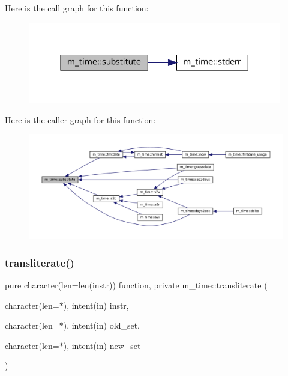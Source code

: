 Here is the call graph for this function\+:\nopagebreak
\begin{figure}[H]
\begin{center}
\leavevmode
\includegraphics[width=314pt]{namespacem__time_a3c8fc82ff0a77573d0f907d4d44dd9bd_cgraph}
\end{center}
\end{figure}
Here is the caller graph for this function\+:\nopagebreak
\begin{figure}[H]
\begin{center}
\leavevmode
\includegraphics[width=350pt]{namespacem__time_a3c8fc82ff0a77573d0f907d4d44dd9bd_icgraph}
\end{center}
\end{figure}
\mbox{\label{namespacem__time_a6e202d6d900515a44ab8a7cbb886a68e}} 
\subsubsection{\texorpdfstring{transliterate()}{transliterate()}}
{\footnotesize\ttfamily pure character(len=len(instr)) function, private m\+\_\+time\+::transliterate (\begin{DoxyParamCaption}\item[{character(len=$\ast$), intent(in)}]{instr,  }\item[{character(len=$\ast$), intent(in)}]{old\+\_\+set,  }\item[{character(len=$\ast$), intent(in)}]{new\+\_\+set }\end{DoxyParamCaption})\hspace{0.3cm}{\ttfamily [private]}}



